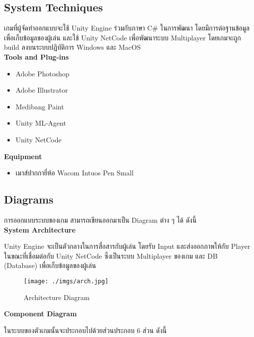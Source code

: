 \documentclass[12pt,oneside,openright,a4paper]{cpe-thai-project}
\begin{document}
\subsection{System Techniques}
เกมที่ผู้จัดทำออกแบบจะใช้ Unity Engine ร่วมกับภาษา C\# 
ในการพัฒนา โดยมีการต่อฐานข้อมูลเพื่อเก็บข้อมูลของผู้เล่น 
และใช้ Unity NetCode เพื่อพัฒนาระบบ Multiplayer 
โดยเกมจะถูก build ลงบนระบบปฏิบัติการ Windows และ MacOS\\

\textbf{Tools and Plug-ins}
\begin{itemize}
  \item Adobe Photoshop
  \item Adobe Illustrator
  \item Medibang Paint
  \item Unity ML-Agent
  \item Unity NetCode
\end{itemize} 

\textbf{Equipment}
\begin{itemize}
  \item เมาส์ปากกายี่ห้อ Wacom Intuos Pen Small
\end{itemize}

\subsection{Diagrams}
การออกแบบระบบของเกม สามารถเขียนออกมาเป็น Diagram ต่าง ๆ ได้ ดังนี้\\

\textbf{System Architecture}

Unity Engine จะเป็นตัวกลางในการสื่อสารกับผู้เล่น 
โดยรับ Input และส่งออกภาพให้กับ Player ในขณะที่เชื่อมต่อกับ 
Unity NetCode ซึ่งเป็นระบบ Multiplayer ของเกม และ DB (Database) 
เพื่อเก็บข้อมูลของผู้เล่น

\begin{figure}[H]\centering
  \texttt{[image: ./imgs/arch.jpg]}
  \caption{Architecture Diagram}\label{fig:arch}
\end{figure}

\textbf{Component Diagram}

ในระบบของตัวเกมนั้นจะประกอบไปด้วยส่วนประกอบ 6 ส่วน ดังนี้
\end{document}
